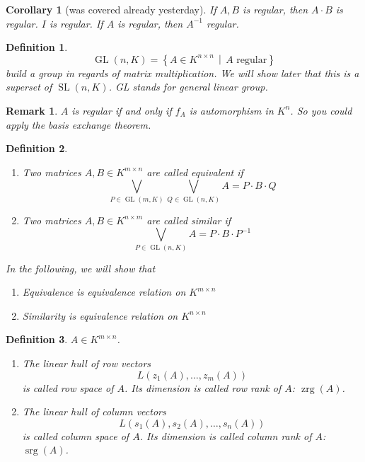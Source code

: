 \documentclass[a4paper,landscape,twocolumn]{article}
\newcommand\setdef[2]{\left\{#1\,\middle|\,#2\right\}}
\newtheorem{defi}{Definition}
\newtheorem{rem}{Remark}
\newtheorem{cor}{Corollary}
\begin{document}
%
\begin{cor}[was covered already yesterday]
  If $A, B$ is regular, then $A \cdot B$ is regular. $I$ is regular.
  If $A$ is regular, then $A^{-1}$ regular.
\end{cor}
%
\begin{defi}
  \label{def-6.16}
  \[ \operatorname{GL}(n, K) = \setdef{A \in K^{n \times n}}{A \text{ regular}} \]
  build a group in regards of matrix multiplication.
  We will show later that this is a superset of $\operatorname{SL}(n, K)$.
  GL stands for \emph{general linear group}.
\end{defi}
%
\begin{rem}
  $A$ is regular if and only if $f_A$ is automorphism in $K^n$.
  So you could apply the basis exchange theorem.
\end{rem}
%
\begin{defi}
  \label{def-6.17}
  \begin{enumerate}
    \item Two matrices $A, B \in K^{m\times n}$ are called equivalent if
      \[ \bigvee_{P \in \operatorname{GL}(m, K)} \bigvee_{Q \in \operatorname{GL}(n, K)} A = P \cdot B \cdot Q \]
    \item Two matrices $A, B \in K^{n\times m}$ are called \emph{similar} if
      \[ \bigvee_{P \in \operatorname{GL}(n, K)} A = P \cdot B \cdot P^{-1} \]
  \end{enumerate}

  In the following, we will show that
  \begin{enumerate}
    \item Equivalence is equivalence relation on $K^{m \times n}$
    \item Similarity is equivalence relation on $K^{n \times n}$
  \end{enumerate}
\end{defi}
%
\begin{defi}
  $A \in K^{m \times n}$.
  \begin{enumerate}
    \item The linear hull of row vectors
      \[ L(z_1(A), \ldots, z_m(A)) \]
      is called \emph{row space} of $A$.
      Its dimension is called \emph{row rank} of $A$: $\operatorname{zrg}(A)$.
    \item The linear hull of column vectors
      \[ L(s_1(A), s_2(A), \ldots, s_n(A)) \]
      is called \emph{column space} of $A$.
      Its dimension is called \emph{column rank} of $A$: $\operatorname{srg}(A)$.
  \end{enumerate}
\end{defi}
\end{document}
